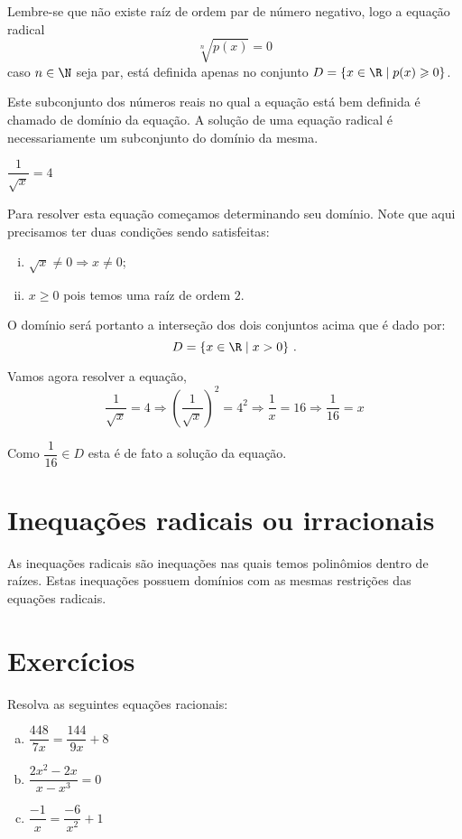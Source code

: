  Lembre-se que não existe raíz de ordem par de número negativo, logo a equação radical
 \[\sqrt[n]{p(x)}= 0\]
 caso $n \in \N$ seja par, está definida apenas no conjunto $D= \{x \in \R \mid p(x) \geqslant 0\}$.
 
 Este subconjunto dos números reais no qual a equação está bem definida é chamado de domínio da equação. A solução de uma equação radical é necessariamente um subconjunto do domínio da mesma.
 
 \begin{exem}
 $\dfrac{1}{\sqrt{x}}= 4$
 
 Para resolver esta equação começamos determinando seu domínio. Note que aqui precisamos ter duas condições sendo satisfeitas:
 \begin{enumerate}[i)]
 \item $\sqrt{x} \neq 0 \Rightarrow x \neq 0$;
 \item $x \geqslant 0$ pois temos uma raíz de ordem $2$.
 \end{enumerate}
 O domínio será portanto a interseção dos dois conjuntos acima que é dado por:
 \[D= \{ x \in \R \mid x > 0 \} \ . \]
 
 Vamos agora resolver a equação, 
 \[\dfrac{1}{\sqrt{x}}= 4 \Rightarrow \left(\dfrac{1}{\sqrt{x}}\right)^2= 4^2 \Rightarrow \dfrac{1}{x}= 16 \Rightarrow \dfrac{1}{16}= x\]
 
 Como $\dfrac{1}{16} \in D$ esta é de fato a solução da equação.
 \end{exem}
 
 \section{Inequações radicais ou irracionais}
 
  \vskip0.3cm
 \colorbox{azul}{
 \begin{minipage}{0.9\linewidth}
 \begin{center}
  As inequações radicais são inequações nas quais temos polinômios dentro de raízes. Estas inequações possuem domínios com as mesmas restrições das equações radicais.
 \end{center}
 \end{minipage}}
 \vskip0.3cm
 
 \section{Exercícios}
 
 \begin{exer}
Resolva as seguintes equações racionais:

\begin{multicols}{2}
\begin{enumerate}[a)]
\item $\dfrac{448}{7x}= \dfrac{144}{9x} + 8$
\item $\dfrac{2x^2 - 2x}{x - x^3}= 0$
\item $\dfrac{-1}{x}= \dfrac{-6}{x^2} + 1$
\end{enumerate}
\end{multicols}
\end{exer}

